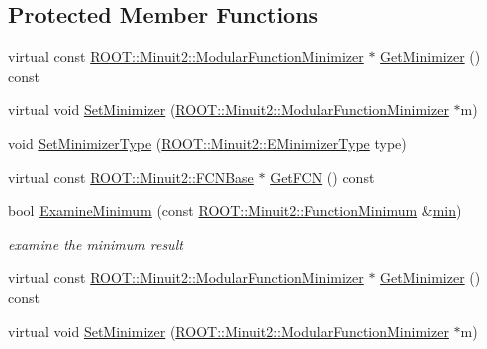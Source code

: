 \subsection*{Protected Member Functions}
\begin{DoxyCompactItemize}
\item 
virtual const \mbox{\hyperlink{classROOT_1_1Minuit2_1_1ModularFunctionMinimizer}{R\+O\+O\+T\+::\+Minuit2\+::\+Modular\+Function\+Minimizer}} $\ast$ \mbox{\hyperlink{classROOT_1_1Minuit2_1_1Minuit2Minimizer_a43246cb7bf4e7553d8e2e9fe25722cb4}{Get\+Minimizer}} () const
\item 
virtual void \mbox{\hyperlink{classROOT_1_1Minuit2_1_1Minuit2Minimizer_acbb90c93015f5cf8e5ee99881a305019}{Set\+Minimizer}} (\mbox{\hyperlink{classROOT_1_1Minuit2_1_1ModularFunctionMinimizer}{R\+O\+O\+T\+::\+Minuit2\+::\+Modular\+Function\+Minimizer}} $\ast$m)
\item 
void \mbox{\hyperlink{classROOT_1_1Minuit2_1_1Minuit2Minimizer_a9f1b93afd722023e5c879453e65f1041}{Set\+Minimizer\+Type}} (\mbox{\hyperlink{namespaceROOT_1_1Minuit2_abdfae3dff24b1dc5a23955c06fe2a8d6}{R\+O\+O\+T\+::\+Minuit2\+::\+E\+Minimizer\+Type}} type)
\item 
virtual const \mbox{\hyperlink{classROOT_1_1Minuit2_1_1FCNBase}{R\+O\+O\+T\+::\+Minuit2\+::\+F\+C\+N\+Base}} $\ast$ \mbox{\hyperlink{classROOT_1_1Minuit2_1_1Minuit2Minimizer_aee4d274acbb0db4702010a62ebdd4d56}{Get\+F\+CN}} () const
\item 
bool \mbox{\hyperlink{classROOT_1_1Minuit2_1_1Minuit2Minimizer_a004057cf512dcbd986799fabe756cecc}{Examine\+Minimum}} (const \mbox{\hyperlink{classROOT_1_1Minuit2_1_1FunctionMinimum}{R\+O\+O\+T\+::\+Minuit2\+::\+Function\+Minimum}} \&\mbox{\hyperlink{SU3__internal_8h_ab0f5fed3171eb00d1c5f037d9f518a23}{min}})
\begin{DoxyCompactList}\small\item\em examine the minimum result \end{DoxyCompactList}\item 
virtual const \mbox{\hyperlink{classROOT_1_1Minuit2_1_1ModularFunctionMinimizer}{R\+O\+O\+T\+::\+Minuit2\+::\+Modular\+Function\+Minimizer}} $\ast$ \mbox{\hyperlink{classROOT_1_1Minuit2_1_1Minuit2Minimizer_a43246cb7bf4e7553d8e2e9fe25722cb4}{Get\+Minimizer}} () const
\item 
virtual void \mbox{\hyperlink{classROOT_1_1Minuit2_1_1Minuit2Minimizer_acbb90c93015f5cf8e5ee99881a305019}{Set\+Minimizer}} (\mbox{\hyperlink{classROOT_1_1Minuit2_1_1ModularFunctionMinimizer}{R\+O\+O\+T\+::\+Minuit2\+::\+Modular\+Function\+Minimizer}} $\ast$m)

\end{DoxyCompactItemize}
